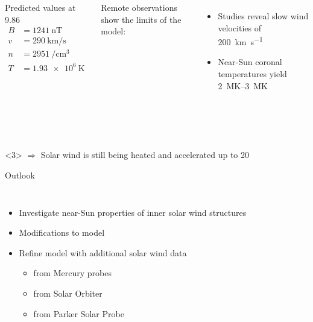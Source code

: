 \begin{frame}[plain,c]{}{}
	\begin{columns}[c]
		
		\begin{block}{\centering Predicted values at 9.86\,\Rs}
			\begin{align*}
				B &= \SI{1241}{\nano\tesla}\\
				v &= \SI{290}{\km\per\s}\\
				n &= \SI{2951}{\per\cm\cubed}\\
				T &= \SI{1.93e6}{\kelvin}
			\end{align*}
		\end{block}


		Remote observations show the limits of the model:
		\begin{itemize}%
			\item Studies reveal slow wind velocities of \SI{200}{\km\per\s} \citep{Sheeley1997,Wang2000}\\
			\item Near-Sun coronal temperatures yield \SIrange{2}{3}{\mega\kelvin} \citep{Billings1959,Liebenberg1975}\\
		\end{itemize}
		
	\end{columns}
	
	\ \\\ 
	\begin{block}<3>{}
		\centering $\Rightarrow$ Solar wind is still being heated and accelerated up to 20\,\Rs{}
	\end{block}
	
\end{frame}
\begin{frame}[plain,c]{Outlook}{}
	\begin{columns}[c]
		
		\begin{itemize}
			\item Investigate near-Sun properties of inner solar wind structures
			\item Modifications to model
			\item Refine model with additional solar wind data
			\begin{itemize}
				\item from Mercury probes
				\item from Solar Orbiter
				\item from Parker Solar Probe
			\end{itemize}
		\end{itemize}
		
		
		
		
	\end{columns}
\end{frame}


